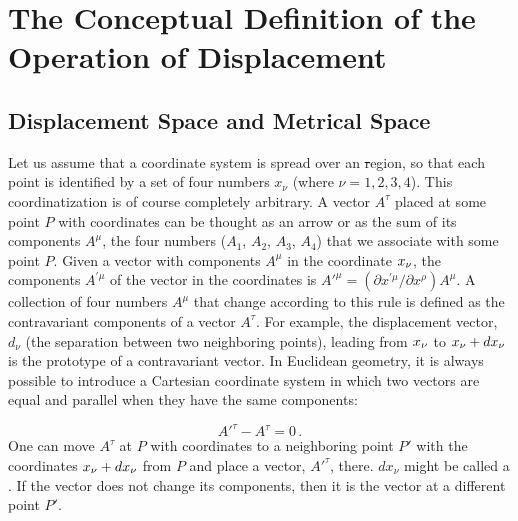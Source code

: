 \documentclass[submitted]{article}
\begin{document}
\section{The Conceptual Definition of the Operation of Displacement}

\subsection{Displacement Space and Metrical Space}

Let us assume that a coordinate system is spread over an \st region, so that each point is identified by a set of four numbers $x_\nu$ (where $\nu=1, 2, 3, 4$). This coordinatization is of course completely arbitrary. A vector $A^\tau$ placed at some point $P$ with coordinates \xn can be thought as an arrow or as the sum of its components $A^\mu$, the four numbers ($A_1$, $A_2$, $A_3$, $A_4$) that we associate with some point $P$. Given a vector with components $A^{\mu}$ in the coordinate $x_{\nu}$, the components $A^{\prime \mu}$ of the vector in the coordinates \xnpr is $A'^{\mu}=\left(\partial x^{\prime \mu} / \partial x^{\rho}\right) A^{\mu}$. A collection of four numbers $A^\mu$ that change according to this rule is defined as the contravariant components of a vector $A^\tau$. For example, the displacement vector, $d_\nu$ (the separation between two neighboring points), leading from $x_{\nu}$ to $x_{\nu} + dx_{\nu}$ is the prototype of a contravariant vector. In Euclidean geometry, it is always possible to introduce a Cartesian coordinate system in which two vectors are equal and parallel when they have the same components:

\begin{equation}\label{eq:samness}
A'^\tau-A^\tau=0\,.
\end{equation}
%
One can move $A^\tau$ at $P$ with coordinates \xn to a neighboring point $P'$ with the coordinates $x_{\nu}+dx_\nu$ from $P$ and place a vector, $A'^{\tau}$, there. $dx_\nu$ might be called a . If the vector does not change its components, then it is the  vector at a different point $P'$. 
\end{document}
